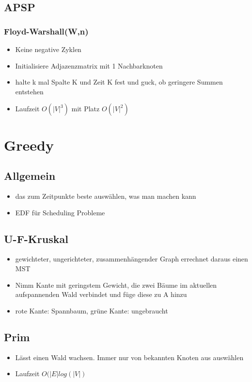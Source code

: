 \documentclass{article}
\begin{document}
\subsection{APSP}
\subsubsection{Floyd-Warshall(W,n)}
\begin{itemize}
\item Keine negative Zyklen
\item Initialisiere Adjazenzmatrix mit 1 Nachbarknoten
\item halte k mal Spalte K und Zeit K fest und guck, ob geringere Summen entstehen
\item Laufzeit $O(|V|^3)$ mit Platz $O(|V|^2)$
\end{itemize}



\section{Greedy}
\subsection{Allgemein}
\begin{itemize}
\item das zum Zeitpunkte beste ausw{\"a}hlen, was man machen kann
\item EDF f{\"u}r Scheduling Probleme
\end{itemize}
 
\subsection{U-F-Kruskal}
\begin{itemize}
\item gewichteter, ungerichteter, zusammenh{\"a}ngender Graph errechnet daraus einen MST
\item Nimm Kante mit geringstem Gewicht, die zwei B{\"a}ume im aktuellen aufspannenden Wald verbindet und f{\"u}ge diese zu A hinzu
\item rote Kante: Spannbaum, gr{\"u}ne Kante: ungebraucht
\end{itemize}


\subsection{Prim}
\begin{itemize}
\item L{\"a}sst einen Wald wachsen. Immer nur von bekannten Knoten aus ausw{\"a}hlen
\item  Laufzeit $O(|E| log(|V|)$
\end{itemize}
\end{document}

